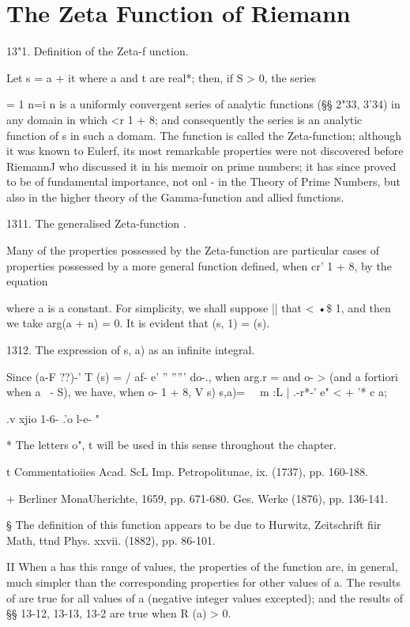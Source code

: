 \chapter{The Zeta Function of Riemann}

13"1. Definition of the Zeta-f unction.

Let s = a + it where a and t are real*; then, if S > 0, the series

= 1 n=i n is a uniformly convergent series of analytic functions (§§
2"33, 3'34) in any domain in which <r 1 + 8; and consequently the
series is an analytic function of s in such a domam. The function is
called the Zeta-function; although it was known to Eulerf, its most
remarkable properties were not discovered before RiemannJ who
discussed it in his memoir on prime numbers; it has since proved to
be of fundamental importance, not onl - in the Theory of Prime
Numbers, but also in the higher theory of the Gamma-function and
allied functions.

1311. The generalised Zeta-function .

Many of the properties possessed by the Zeta-function are particular
cases of properties possessed by a more general function defined, when
cr' 1 + 8, by the equation

where a is a constant. For simplicity, we shall suppose || that < •\$
1, and then we take arg(a + n) = 0. It is evident that (s, 1) = (s).

1312. The expression of s, a) as an infinite integral.

Since (a-F ??)-' T (s) = / af- e' '' ''''' do-., when arg.r = and o- >
(and a fortiori when a \ - S), we have, when o- 1 + 8, V s) s,a)= \ \
m :L | .-r*-' e" < + '* c a;

.v xjio 1-6- .'o l-e- "

* The letters o", t will be used in this sense throughout the chapter.

t Commentatioiies Acad. ScL Imp. Petropolitunae, ix. (1737), pp.
160-188.

+ Berliner MonaUherichte, 1659, pp. 671-680. Ges. Werke (1876), pp.
136-141.

§ The definition of this function appears to be due to Hurwitz,
Zeitschrift fiir Math, ttnd Phys. xxvii. (1882), pp. 86-101.

II When a has this range of values, the properties of the function
are, in general, much simpler than the corresponding properties for
other values of a. The results of\hardsubsectionref{13}{1}{4} are true for all values of a
(negative integer values excepted); and the results of §§ 13-12,
13-13, 13-2 are true when R (a) > 0.

